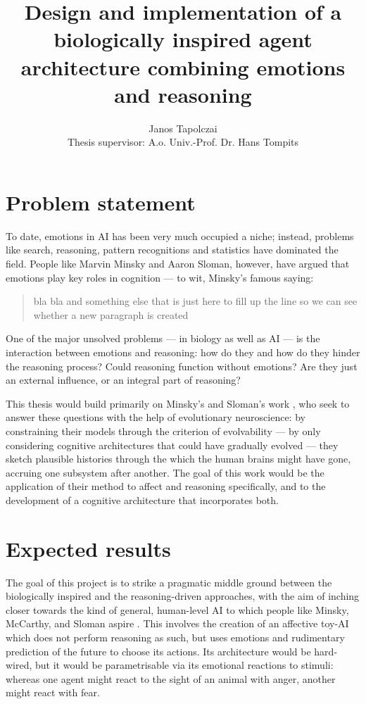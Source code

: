 \documentclass[bibliography=totoc ]{scrartcl}
\title{{\huge Design and implementation of a biologically inspired agent architecture combining emotions and reasoning}}
\author{Janos Tapolczai\\Thesis supervisor: A.o. Univ.-Prof. Dr. Hans Tompits}
\begin{document}
\maketitle

\section{Problem statement}

To date, emotions in AI has been very much occupied a niche; instead, problems like search, reasoning, pattern recognitions and statistics have dominated the field. People like Marvin Minsky and Aaron Sloman, however, have argued that emotions play key roles in cognition --- to wit, Minsky's famous saying:

\begin{quote}
bla bla
and something else that is just here to fill up the line so we can see whether a new paragraph is created
\end{quote}

One of the major unsolved problems --- in biology as well as AI --- is the interaction between emotions and reasoning: how do they and how do they hinder the reasoning process? Could reasoning function without emotions? Are they just an external influence, or an integral part of reasoning?

This thesis would build primarily on Minsky's \cite{emotionMachine} and Sloman's work \cite{slomanNiche}, who seek to answer these questions with the help of evolutionary neuroscience: by constraining their models through the criterion of evolvability --- by only considering cognitive architectures that could have gradually evolved --- they sketch plausible histories through the which the human brains might have gone, accruing one subsystem after another. The goal of this work would be the application of their method to affect and reasoning specifically, and to the development of a cognitive architecture that incorporates both.

\section{Expected results}

The goal of this project is to strike a pragmatic middle ground between the biologically inspired and the reasoning-driven approaches, with the aim of inching closer towards the kind of general, human-level AI to which people like Minsky, McCarthy, and Sloman aspire \cite{emotionMachine, mcCarthy2007, minsky2004}. This involves the creation of an affective toy-AI which does not perform reasoning as such, but uses emotions and rudimentary prediction of the future to choose its actions. Its architecture would be hard-wired, but it would be parametrisable via its emotional reactions to stimuli: whereas one agent might react to the sight of an animal with anger, another might react with fear.
\end{document}
